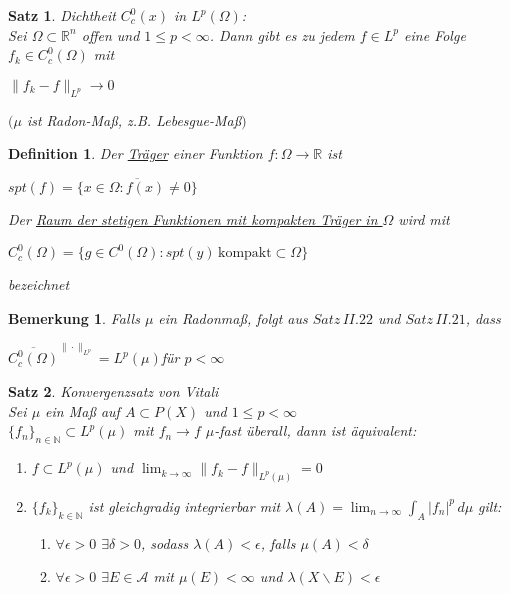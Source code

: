 \documentclass[11pt]{memoir}
\theoremstyle{changebreak}
\newtheorem{Definition}{Definition}[chapter]
\newtheorem{Bemerkung}{Bemerkung}[chapter]
\newtheorem{Satz}{Satz}[chapter]
\begin{document}
\begin{Satz}
\emph{Dichtheit $C^0_c (x)$ in $L^p(\Omega)$}: \\
Sei $\Omega \subset \mathbb R^n$ offen und $1 \leq p < \infty$. Dann gibt es zu jedem $f \in L^p$ eine Folge $f_k \in C^0_c (\Omega)$ mit 
\begin{center}
	$\|f_k - f\|_{L^p} \rightarrow 0$
\end{center}
$(\mu$ ist Radon-Maß, z.B. Lebesgue-Maß$)$
\end{Satz}

\begin{Definition}
Der \underline{Träger} einer Funktion $f: \Omega \rightarrow \mathbb R$ ist 
\begin{center}
	$spt(f) = \overline{\{x \in \Omega: f(x) \ne 0\}} $
\end{center}
Der \underline{Raum der stetigen Funktionen mit kompakten Träger in $\Omega$} wird mit
\begin{center}
	$C_c^0 (\Omega) = \{g \in C^0(\Omega): spt(y) \, \text{kompakt} \subset \Omega\}$
\end{center}
bezeichnet
\end{Definition}


\begin{Bemerkung}
Falls $\mu$ ein Radonmaß, folgt aus $Satz \, II.22$ und $Satz \,  II.21$, dass 
\begin{center}
	$\overline{C^0_c (\Omega)}^{\|\cdotp\|_{L^p}} = L^p (\mu)$\quad  für $p < \infty$
\end{center}
\end{Bemerkung}

\begin{Satz}
\emph{Konvergenzsatz von Vitali} \\
Sei $\mu$ ein Maß auf $A \subset P(X)$ und $1 \leq p < \infty$ \\
$\{f_n\}_{n \in \mathbb N} \subset L^p(\mu)$ mit $f_n \rightarrow f$ $\mu$-fast überall, dann ist äquivalent:
\begin{enumerate}
	\item $f \subset L^p(\mu)$ und $\lim_{k \rightarrow \infty} \|f_k -f \|_{L^p (\mu)} = 0$
	\item $\{f_k\}_{k \in \mathbb N}$ ist gleichgradig integrierbar mit $\lambda(A) = \lim_{n \rightarrow \infty} \int_A |f_n|^p \, d\mu$ gilt:
	\begin{enumerate}
		\item $\forall \epsilon > 0$ $\exists \delta > 0$, sodass $\lambda(A) < \epsilon$, falls $\mu(A) < \delta$
		\item $\forall \epsilon > 0$ $\exists E \in \mathscr A$ mit $\mu(E) < \infty$ und $\lambda(X \backslash E) < \epsilon$
	\end{enumerate}
\end{enumerate}

\end{Satz}
\end{document}

